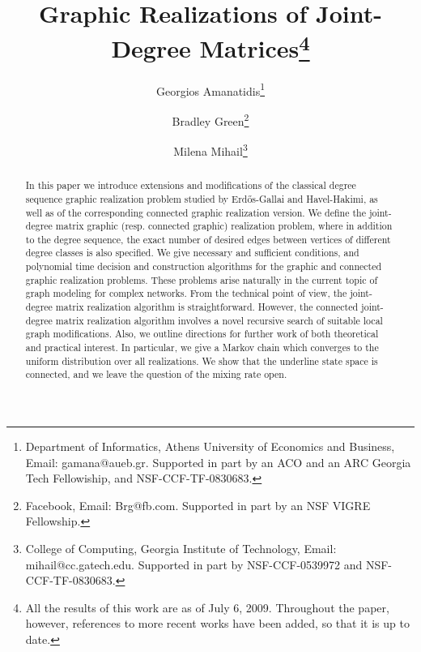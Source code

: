 \documentclass[12pt,a4paper]{article}
\theoremstyle{definition}
\theoremstyle{plain}
\begin{document}
\title{Graphic Realizations of Joint-Degree Matrices\footnote{All the results of this work are as of July 6, 2009. Throughout the paper, however, references to more recent works have been added, so that it is up to date.}}

\author{Georgios Amanatidis\thanks{Department of Informatics, Athens University of Economics and Business, Email: \textsf{gamana@aueb.gr}.
Supported in part by an ACO and an ARC 
Georgia Tech Fellowiship, and NSF-CCF-TF-0830683.}
\and Bradley Green\thanks{Facebook, Email: \textsf{Brg@fb.com}.
Supported in part by an NSF VIGRE Fellowship.} 
\and Milena Mihail\thanks{College of Computing, 
Georgia Institute of Technology, Email: \textsf{mihail@cc.gatech.edu}. 
Supported in part by NSF-CCF-0539972 and NSF-CCF-TF-0830683.}}

\date{\vspace{-5ex}}

\maketitle
\thispagestyle{empty} 

\hspace{1cm}

\begin{abstract}
In this paper we introduce extensions and modifications of the
classical degree sequence graphic realization problem studied by Erd\H{o}s-Gallai and Havel-Hakimi, 
as well as of the corresponding connected graphic realization version.
We define the joint-degree matrix graphic 
(resp. connected graphic) realization problem,
where in addition to the degree sequence, 
the exact number of desired edges 
between vertices of different degree classes
is also specified. 
We give necessary and sufficient conditions, and polynomial time decision and construction algorithms 
for the graphic and connected graphic realization problems.
These problems arise naturally in the current topic of graph modeling for complex networks.
From the technical point of view, 
the joint-degree matrix realization algorithm is straightforward.
However, the connected joint-degree matrix realization algorithm 
involves a novel recursive search of suitable local graph modifications.
Also, we outline directions for further work of both theoretical and practical interest. In particular,
we give a Markov chain which converges to the uniform distribution over all realizations. We show
that the underline state space is connected, and we leave the question of the mixing rate open.
\end{abstract}
\end{document}
